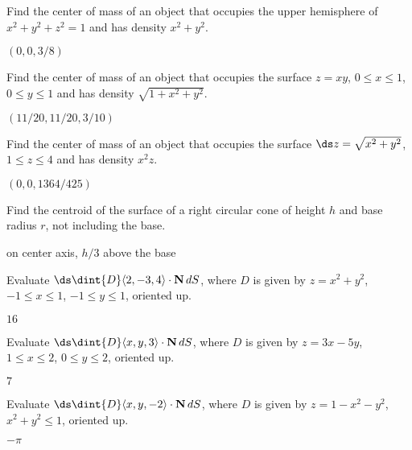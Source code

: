 \begin{exercises}

\begin{exercise} Find the center of mass of an object that occupies the upper
hemisphere of $x^2+y^2+z^2=1$ and has density $x^2+y^2$.
\begin{answer} $(0,0,3/8)$
\end{answer}\end{exercise}

\begin{exercise} Find the center of mass of an object that occupies the
surface $z=xy$, $0\le x\le1$, $0\le y\le 1$ and has density $\sqrt{1+x^2+y^2}$.
\begin{answer} $(11/20,11/20,3/10)$
\end{answer}\end{exercise}

\begin{exercise} Find the center of mass of an object that occupies the
surface $\ds z=\sqrt{x^2+y^2}$, $1\le z\le4$ and has density $x^2z$.
\begin{answer} $(0,0,1364/425)$
\end{answer}\end{exercise}

\begin{exercise} Find the centroid of the surface of a right circular cone of
height $h$ and base radius $r$, not including the base.
\begin{answer} on center axis, $h/3$ above the base
\end{answer}\end{exercise}

\begin{exercise} Evaluate $\ds \dint{D} \langle 2,-3,4\rangle\cdot {\bf
  N}\,dS$, where $D$ is given by $z=x^2+y^2$, $-1\le x\le 1$, $-1\le
y\le 1$, oriented up.
\begin{answer} $16$
\end{answer}\end{exercise}

\begin{exercise} Evaluate $\ds \dint{D} \langle x,y,3\rangle\cdot {\bf
  N}\,dS$, where $D$ is given by $z=3x-5y$, $1\le x\le 2$, $0\le
y\le 2$, oriented up.
\begin{answer} $7$
\end{answer}\end{exercise}

\begin{exercise} Evaluate $\ds \dint{D} \langle x,y,-2\rangle\cdot {\bf
  N}\,dS$, where $D$ is given by $z=1-x^2-y^2$, $x^2+y^2\le1$,
oriented up.
\begin{answer} $-\pi$
\end{answer}\end{exercise}


\end{exercises}

